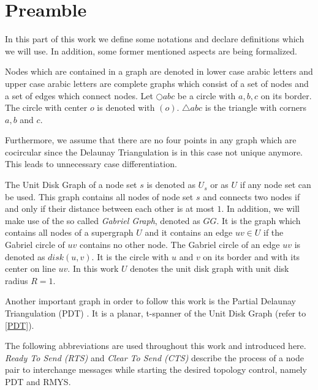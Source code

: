 \section{Preamble}
In this part of this work we define some notations and declare definitions which we will use.
In addition, some former mentioned aspects are being formalized.

Nodes which are contained in a graph are denoted in lower case arabic letters and upper case arabic letters are complete graphs which consist of a set of nodes and a set of edges which connect nodes.
Let $\bigcirc{abc} $ be a circle with $a, b, c $ on its border.
The circle with center $o $ is denoted with $(o) $.
$\triangle{abc} $ is the triangle with corners $a,b $ and $c $.

Furthermore, we assume that there are no four points in any graph which are cocircular since the Delaunay Triangulation is in this case not unique anymore.
This leads to unnecessary case differentiation.

The Unit Disk Graph of a node set $s $ is denoted as $U_s $ or as $U $ if any node set can be used.
This graph contains all nodes of node set $s $ and connects two nodes if and only if their distance between each other is at most $1 $.
In addition, we will make use of the so called \emph{Gabriel Graph}, denoted as $GG $. 
It is the graph which contains all nodes of a supergraph $U $ and it contains an edge $uv \in U $ if the Gabriel circle of $uv $ contains no other node.
The Gabriel circle of an edge $uv $ is denoted as $disk(u, v) $.
It is the circle with $u $ and $v $ on its border and with its center on line $uv $. 
In this work $U $ denotes the unit disk graph with unit disk radius $R = 1 $.

Another important graph in order to follow this work is the Partial Delaunay Triangulation (PDT)  \cite{pdt}. It is a planar, t-spanner of the Unit Disk Graph (refer to \ref{PDT}).

The following abbreviations are used throughout this work and introduced here.
\emph{Ready To Send (RTS)} and \emph{Clear To Send (CTS)} describe the process of a node pair to interchange messages while starting the desired topology control, namely PDT and RMYS.

